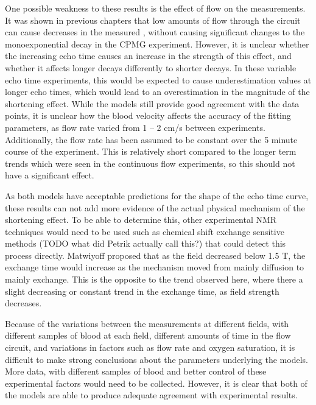 One possible weakness to these results is the effect of flow on the \Ttwo measurements.
It was shown in previous chapters that low amounts of flow through the circuit can cause decreases in the measured \Ttwo, without causing significant changes to the monoexponential decay in the CPMG experiment.
However, it is unclear whether the increasing echo time causes an increase in the strength of this effect, and whether it affects longer \Ttwo decays differently to shorter decays.
In these variable echo time experiments, this would be expected to cause underestimation \Ttwo values at longer echo times, which would lead to an overestimation in the magnitude of the \Ttwo shortening effect.
While the models still provide good agreement with the data points, it is unclear how the blood velocity affects the accuracy of the fitting parameters, as flow rate varied from 1 -- 2 cm/s between experiments.
Additionally, the flow rate has been assumed to be constant over the 5 minute course of the experiment.
This is relatively short compared to the longer term trends which were seen in the continuous flow experiments, so this should not have a significant effect.

As both models have acceptable predictions for the shape of the echo time curve, these results can not add more evidence of the actual physical mechanism of the \Ttwo shortening effect.
To be able to determine this, other experimental NMR techniques would need to be used such as chemical shift exchange sensitive methods (TODO what did Petrik actually call this?) that could detect this process directly.
Matwiyoff \cite{Matwiyofflineshapeswater1990} proposed that as the field decreased below 1.5 T, the exchange time would increase as the mechanism moved from mainly diffusion to mainly exchange.
This is the opposite to the trend observed here, where there a slight decreasing or constant trend in the exchange time, as field strength decreases.

Because of the variations between the measurements at different fields, with different samples of blood at each field, different amounts of time in the flow circuit, and variations in factors such as flow rate and oxygen saturation, it is difficult to make strong conclusions about the parameters underlying the models.
More data, with different samples of blood and better control of these experimental factors would need to be collected.
However, it is clear that both of the models are able to produce adequate agreement with experimental results.
